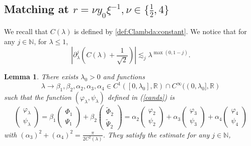 \documentclass[11 pt]{amsart}
\newtheorem{lem}{Lemma}[section]
\theoremstyle{definition}
\theoremstyle{remark}
\numberwithin{equation}{section}
\begin{document}
\subsection{Matching at $r = \nu y_0 \xi^{- 1}, \nu \in \{ \frac 12, 4 \}$}
We recall that $C(\lambda)$ is defined by \eqref{def:Clambda:constant}. We notice that for any $j \in \mathbb{N}$, for $\lambda\leq 1$,
\begin{equation} \label{def:Clambda:constant:bound-lambda-to 0} | \partial_{\lambda}^j (C (\lambda) +\frac{1}{\sqrt{2}}) | \lesssim_j \lambda^{\max(0,1-j)} .
\end{equation}

\begin{lem}
  \label{secondmatching}There exists $\lambda_0 > 0$ and functions
  \[ \lambda \rightarrow \beta_1, \beta_2, \alpha_2,
     \alpha_3, \alpha_4 \in C^1 ([0, \lambda_0], \mathbb{R}) \cap
     C^{\infty} (( 0, \lambda_0], \mathbb{R}) \]
  such that the function $(\varphi_{\lambda}, \psi_{\lambda})$ defined in
  (\ref{cands}) is
\begin{equation} \label{id:matching-functions-low}\left(\begin{array}{c}
       \varphi_{\lambda}\\
       \psi_{\lambda}
     \end{array}\right) =\beta_1 \left(\begin{array}{c}
       \Phi_1\\
       \Psi_1
     \end{array}\right) + \beta_2 \left(\begin{array}{c}
       \widetilde{\Phi}_2\\
       \widetilde{\Psi}_2
     \end{array}\right) = \alpha_2 \left(\begin{array}{c}
       \varphi_2\\
       \psi_2
     \end{array}\right) + \alpha_3 \left(\begin{array}{c}
       \varphi_3\\
       \psi_3
     \end{array}\right) + \alpha_4 \left(\begin{array}{c}
       \varphi_4\\
       \psi_4
     \end{array}\right) 
\end{equation}
  with $(\alpha_3)^2 + (\alpha_4)^2 = \frac{\pi}{2 C^{2}(\lambda)}$. They satisfy
  the estimate for any $j \in \mathbb{N}$,

\end{lem}
\end{document}
